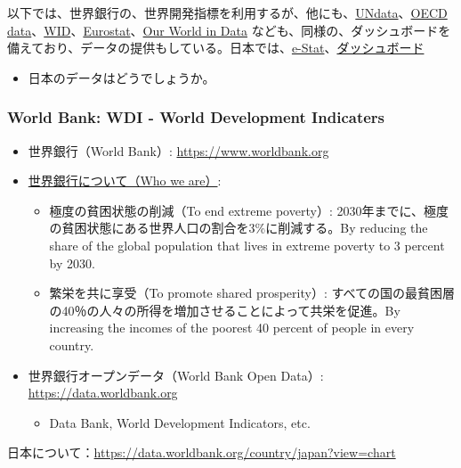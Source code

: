\documentclass[
]{bxjsbook}
\providecommand{\tightlist}{%
  \setlength{\itemsep}{0pt}\setlength{\parskip}{0pt}}
\theoremstyle{definition}
\theoremstyle{definition}
\theoremstyle{definition}
\theoremstyle{definition}
\theoremstyle{remark}
\begin{document}
以下では、世界銀行の、世界開発指標を利用するが、他にも、\href{https://data.un.org}{UNdata}、\href{https://data.oecd.org}{OECD data}、\href{https://wid.world}{WID}、\href{https://ec.europa.eu/eurostat}{Eurostat}、\href{https://ourworldindata.org}{Our World in Data} なども、同様の、ダッシュボードを備えており、データの提供もしている。日本では、\href{https://www.e-stat.go.jp/}{e-Stat}、\href{https://dashboard.e-stat.go.jp}{ダッシュボード}

\begin{itemize}
\tightlist
\item
  日本のデータはどうでしょうか。
\end{itemize}

\hypertarget{world-bank-wdi---world-development-indicaters}{%
\subsubsection{World Bank: WDI - World Development Indicaters}\label{world-bank-wdi---world-development-indicaters}}

\begin{itemize}
\tightlist
\item
  世界銀行（World Bank）: \url{https://www.worldbank.org}
\item
  \href{https://www.worldbank.org/en/who-we-are}{世界銀行について（Who we are）}:

  \begin{itemize}
  \tightlist
  \item
    極度の貧困状態の削減（To end extreme poverty）: 2030年までに、極度の貧困状態にある世界人口の割合を3\%に削減する。By reducing the share of the global population that lives in extreme poverty to 3 percent by 2030.
  \item
    繁栄を共に享受（To promote shared prosperity）: すべての国の最貧困層の40％の人々の所得を増加させることによって共栄を促進。By increasing the incomes of the poorest 40 percent of people in every country.
  \end{itemize}
\item
  世界銀行オープンデータ（World Bank Open Data）: \url{https://data.worldbank.org}

  \begin{itemize}
  \tightlist
  \item
    Data Bank, World Development Indicators, etc.
  \end{itemize}
\end{itemize}

日本について：\url{https://data.worldbank.org/country/japan?view=chart}
\end{document}
